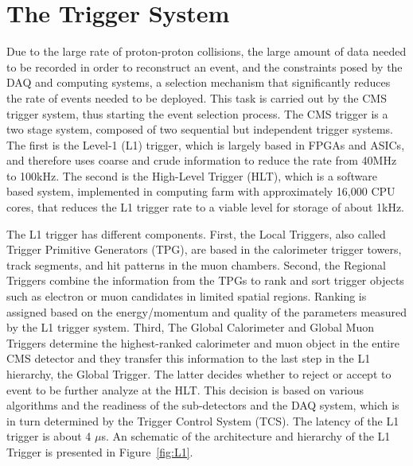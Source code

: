 \section{The Trigger System}
Due to the large rate of proton-proton collisions, the large amount
of data needed to be recorded in order to reconstruct an event, and the constraints posed by
the DAQ and computing systems, a
selection mechanism that significantly reduces the rate of events
needed to be deployed. This task is carried out by the CMS trigger
system, thus starting the event selection process. The CMS trigger
is a two stage system, composed of two sequential but independent
trigger systems. The first is the Level-1 (L1) trigger, which is
largely based in FPGAs and ASICs, and therefore uses coarse and crude
information to reduce the rate from 40\unit{MHz} to 100\unit{kHz}. The
second is the High-Level Trigger (HLT), which is a software based
system, implemented in computing farm with approximately 16,000 CPU
cores, that reduces the L1 trigger rate to a viable level for storage
of about 1\unit{kHz}. 

The L1 trigger has different components. First, the Local Triggers, also called Trigger Primitive Generators
(TPG), are based in the calorimeter trigger towers, track segments,
and hit patterns in the muon chambers. Second, the Regional Triggers
combine the information from the TPGs to rank and sort trigger objects
such as electron or muon candidates in limited spatial
regions. Ranking is assigned based on the energy/momentum and quality
of the parameters measured by the L1 trigger system. Third, The Global
Calorimeter and Global Muon Triggers determine the highest-ranked
calorimeter and muon object in the entire CMS detector and they
transfer this information to the last step in the L1 hierarchy, the
Global Trigger. The latter decides whether to reject or accept to
event to be further analyze at the HLT. This decision is based on
various algorithms and the readiness of the sub-detectors and the DAQ
system, which is in turn determined by the Trigger Control System
(TCS). The latency of the L1 trigger is about 4 $\mu$s. An schematic of the architecture and hierarchy of the L1
Trigger is presented in Figure~\ref{fig:L1}. 

